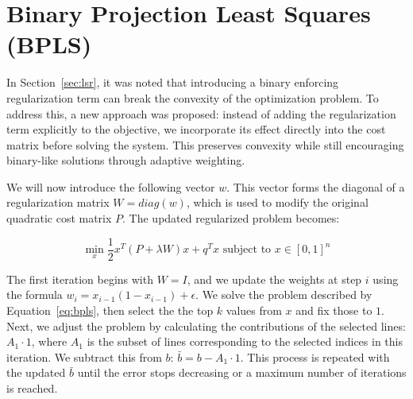 \section{Binary Projection Least Squares (BPLS)}

In Section~\ref{sec:lsr}, it was noted that introducing a binary enforcing regularization term can break the convexity of the optimization problem. To address this, a new approach was proposed: instead of adding the regularization term explicitly to the objective, we incorporate its effect directly into the cost matrix before solving the system. This preserves convexity while still encouraging binary-like solutions through adaptive weighting.

We will now introduce the following vector \(w\). This vector forms the diagonal of a regularization matrix \(W = diag(w)\), which is used to modify the original quadratic cost matrix \(P\). The updated regularized problem becomes:

\begin{equation}
\label{eq:bpls}
\min_{x} \frac{1}{2} x^T(P + \lambda W)x + q^Tx \text{ subject to } x \in [0,1]^n
\end{equation}

The first iteration begins with \(W = I\), and we update the weights at step \(i\) using the formula \(w_i = x_{i-1}(1-x_{i-1}) + \epsilon\). We solve the problem described by Equation~\ref{eq:bpls}, then select the the top \(k\) values from \(x\) and fix those to \(1\). Next, we adjust the problem by calculating the contributions of the selected lines: \(A_1 \cdot 1\), where \(A_1\) is the subset of lines corresponding to the selected indices in this iteration. We subtract this from \(b\): \(\bar{b} = b - A_1 \cdot 1\). This process is repeated with the updated \(\bar{b}\) until the error stops decreasing or a maximum number of iterations is reached.

